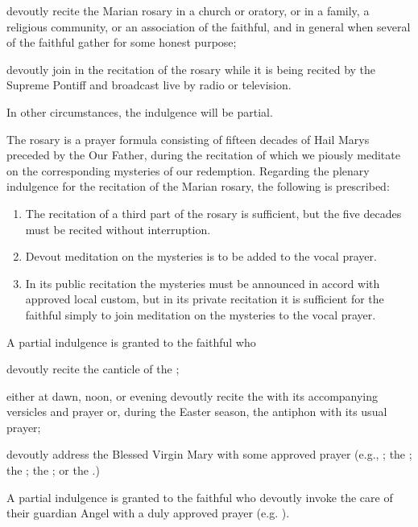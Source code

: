  devoutly recite the Marian rosary in a church or oratory, or in a family, a religious community, or an association of the faithful, and in general when several of the faithful gather for some honest purpose;

 devoutly join in the recitation of the rosary while it is being recited by the Supreme Pontiff and broadcast live by radio or television.

In other circumstances, the indulgence will be partial.

The rosary is a prayer formula consisting of fifteen decades of Hail Marys preceded by the Our Father, during the recitation of which we piously meditate on the corresponding mysteries of our redemption.
Regarding the plenary indulgence for the recitation of the Marian rosary, the following is prescribed:
\begin{enumerate}
	\item The recitation of a third part of the rosary is sufficient, but the five decades must be recited without interruption.
	\item Devout meditation on the mysteries is to be added to the vocal prayer.
	\item In its public recitation the mysteries must be announced in accord with approved local custom, but in its private recitation it is sufficient for the faithful simply to join meditation on the mysteries to the vocal prayer.
\end{enumerate}

 A partial indulgence is granted to the faithful who

 devoutly recite the canticle of the ;

 either at dawn, noon, or evening devoutly recite the  with its accompanying versicles and prayer or, during the Easter season, the  antiphon with its usual prayer;

 devoutly address the Blessed Virgin Mary with some approved prayer (e.g., ; the ; the ; the ; or the .)

\hypertarget{grant18}{}
A partial indulgence is granted to the faithful who devoutly invoke the care of their guardian Angel with a duly approved prayer (e.g. ).

